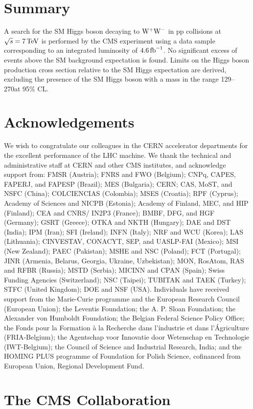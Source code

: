 \documentclass[11pt,twoside,a4paper,cmspaper,final,collab]{cms-tdr}
\begin{document}
\section{Summary}
\label{sec:summary}
A search for the SM Higgs boson decaying to $\mathrm{W^+}{}\mathrm{W^-}$ in pp
collisions at $\sqrt{s} = 7\,\text{Te\hspace{-.08em}V}$ is performed by the CMS experiment
using a data sample corresponding
to an integrated luminosity of $4.6\mbox{\ensuremath{\,\text{fb}^\text{$-$1}}}$. No significant excess of events
above the SM background expectation is found. Limits on
the Higgs boson production cross section relative to the SM Higgs
expectation are derived, excluding the presence of the SM Higgs boson
with a mass in the range 129--270\GeV at 95\% CL.

\section*{Acknowledgements}
We wish to congratulate our colleagues in the CERN accelerator departments for the excellent
performance of the LHC machine. We thank the technical and administrative staff at CERN and other CMS
institutes, and acknowledge support from: FMSR (Austria); FNRS and FWO (Belgium); CNPq, CAPES, FAPERJ,
and FAPESP (Brazil); MES (Bulgaria); CERN; CAS, MoST, and NSFC (China); COLCIENCIAS (Colombia); MSES
(Croatia); RPF (Cyprus); Academy of Sciences and NICPB (Estonia); Academy of Finland, MEC, and HIP
(Finland); CEA and CNRS/ IN2P3 (France); BMBF, DFG, and HGF (Germany); GSRT (Greece); OTKA and NKTH
(Hungary); DAE and DST (India); IPM (Iran); SFI (Ireland); INFN (Italy); NRF and WCU (Korea); LAS
(Lithuania); CINVESTAV, CONACYT, SEP, and UASLP-FAI (Mexico); MSI (New Zealand); PAEC (Pakistan);
MSHE and NSC (Poland); FCT (Portugal); JINR (Armenia, Belarus, Georgia, Ukraine, Uzbekistan); MON,
RosAtom, RAS and RFBR (Russia); MSTD (Serbia); MICINN and CPAN (Spain); Swiss Funding Agencies
(Switzerland); NSC (Taipei); TUBITAK and TAEK (Turkey); STFC (United Kingdom); DOE and NSF (USA).
Individuals have received support from the Marie-Curie programme and the European Research Council
(European Union); the Leventis Foundation; the A. P. Sloan Foundation; the Alexander von Humboldt
Foundation; the Belgian Federal Science Policy Office; the Fonds pour la Formation \`a la Recherche
dans l'\'industrie et dans l'\'Agriculture (FRIA-Belgium); the Agentschap voor Innovatie door Wetenschap
en Technologie (IWT-Belgium); the Council of Science and Industrial Research, India; and the HOMING
PLUS programme of Foundation for Polish Science, cofinanced from European Union, Regional Development
Fund.

\cleardoublepage \appendix\section{The CMS Collaboration \label{app:collab}}\begin{sloppypar}\end{sloppypar}
\end{document}
